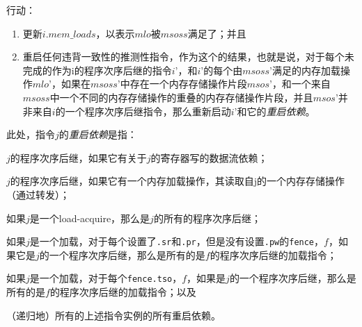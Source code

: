 行动：
\begin{enumerate}
\item 更新$i.\textit{mem\_loads}$，以表示$mlo$被$msoss$满足了；并且
\item 重启任何违背一致性的推测性指令，作为这个的结果，也就是说，对于每个未完成的作为i的程序次序后继的指令$i’$，和$i’$的每个由$msoss’$满足的内存加载操作$mlo’$，如果在$msoss’$中存在一个内存存储操作片段$msos’$，和一个来自$msoss$中一个不同的内存存储操作的重叠的内存存储操作片段，并且$msos’$并非来自$i$的一个程序次序后继指令，那么重新启动$i’$和它的{\em 重启依赖}。
\end{enumerate}
此处，指令$j$的{\em 重启依赖}是指：
\begin{tightlist}
\item $j$的程序次序后继，如果它有关于$j$的寄存器写的数据流依赖；  %
\item $j$的程序次序后继，如果它有一个内存加载操作，其读取自j的一个内存存储操作（通过转发）；  %
\item 如果$j$是一个load-acquire，那么是$j$的所有的程序次序后继；  %
\item 如果$j$是一个加载，对于每个设置了{\tt .sr}和{\tt .pr}，但是没有设置{\tt .pw}的{\tt fence}，$f$，如果它是$j$的一个程序次序后继，那么是所有的是$f$的程序次序后继的加载指令；  %
\item 如果$j$是一个加载，对于每个{\tt fence.tso}，$f$，如果是$j$的一个程序次序后继，那么是所有的是$f$的程序次序后继的加载指令；以及  %
\item（递归地）所有的上述指令实例的所有重启依赖。  %
\end{tightlist}

